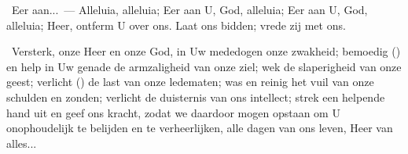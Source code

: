 \documentclass[12pt,twoside,a5paper]{article}
\begin{document}
\begin{halfparskip}
  \dd~Eer aan...~--- Alleluia, alleluia; Eer aan U, God, alleluia; Eer aan U, God, alleluia; Heer, ontferm U over ons. Laat ons bidden; vrede zij met ons.

  \cc~Versterk, onze Heer en onze God, in Uw mededogen onze zwakheid; bemoedig () en help in Uw genade de armzaligheid van onze ziel; wek de slaperigheid van onze geest; verlicht () de last van onze ledematen; was en reinig het vuil van onze schulden en zonden; verlicht de duisternis van ons intellect; strek een helpende hand uit en geef ons kracht, zodat we daardoor mogen opstaan om U onophoudelijk te belijden en te verheerlijken, alle dagen van ons leven, Heer van alles...
\end{halfparskip}

\PSALMtitle{}{}

\begin{halfparskip}
  \psalmsubtitle{}
\end{halfparskip}

\end{document}
